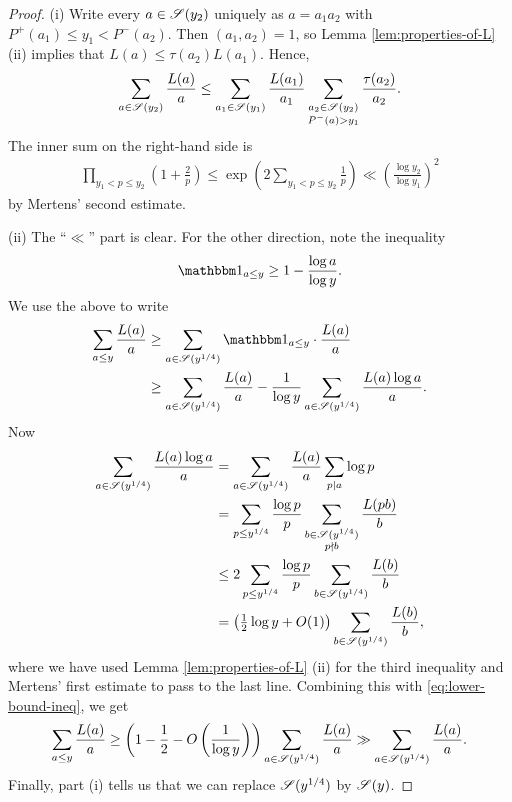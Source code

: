 \begin{proof}
    (i) Write every $a \in \mathscr{S}(y_2)$ uniquely as $a = a_1 a_2$ with $P^+(a_1) \le y_1 < P^- (a_2)$.
    Then $(a_1, a_2 ) = 1$, so Lemma \ref{lem:properties-of-L} (ii) implies that $L(a) \le \tau(a_2) L(a_1)$.
    Hence,
    \begin{equation*}
        \sum \limits_{a \in \mathscr{S}(y_2)} \frac{L(a)}{a} \le \sum \limits_{a_1 \in \mathscr{S}(y_1)} \frac{L(a_1)}{a_1} \sum \limits_{\substack{a_2 \in \mathscr{S}(y_2) \\ P^-(a) > y_1}} \frac{\tau(a_2)}{a_2}.
    \end{equation*}
    The inner sum on the right-hand side is
    \begin{align*}
        \prod \limits_{y_1 < p \le y_2}  \left(1 + \frac{2}{p} \right) \le \exp \left( 2 \sum \limits_{y_1 < p \le y_2} \frac{1}{p} \right) \ll \left(\frac{\log y_2}{\log y_1}\right)^2
    \end{align*}
    by Mertens' second estimate. 

    (ii) The ``$\ll$'' part is clear.
    For the other direction, note the inequality
    \begin{equation*}
        \ind{a \le y} \ge 1 - \frac{\log a}{\log y}.
    \end{equation*}
    We use the above to write
    \begin{align} \label{eq:lower-bound-ineq}
        \sum \limits_{a \le y} \frac{L(a)}{a} &\ge \sum \limits_{a \in \mcS(y^{1/4})} \ind{a \le y} \cdot \frac{L(a)}{a}\nonumber \\&\ge \sum \limits_{a \in \mcS(y^{1/4})} \frac{L(a)}{a}  - \frac{1}{\log y} \sum \limits_{a \in \mcS(y^{1/4})} \frac{L(a) \log a}{a}.
    \end{align}
    Now
    \begin{align*}
        \sum \limits_{a \in \mathscr{S}(y^{1/4})} \frac{L(a) \log a}{a} 
            &= \sum \limits_{a \in \mathscr{S}(y^{1/4})} \frac{L(a)}{a} \sum\limits_{p \mid a} \log p \\
            &= \sum \limits_{p \le y^{1/4}} \frac{\log p}{p} \sum\limits_{\substack{b \in \mathscr{S}(y^{1/4})\\p \nmid b}} \frac{L(pb)}{b} \\
            &\le 2\sum \limits_{p \le y^{1/4}} \frac{\log p}{p} \sum\limits_{b \in \mathscr{S}(y^{1/4})} \frac{L(b)}{b} \\
            &= \left({\tfrac{1}{2}} \log y + O(1) \right) \sum\limits_{b \in \mathscr{S}(y^{1/4})} \frac{L(b)}{b},
    \end{align*}
    where we have used Lemma \ref{lem:properties-of-L} (ii) for the third inequality and Mertens' first estimate to pass to the last line.
    Combining this with \eqref{eq:lower-bound-ineq}, we get
    \begin{equation*}
        \sum \limits_{a \le y} \frac{L(a)}{a} \ge \left(1 - \frac{1}{2} - O\left( \frac{1}{\log y} \right) \right)\sum \limits_{a \in \mathscr{S}(y^{1/4})} \frac{L(a)}{a} \gg \sum \limits_{a \in \mathscr{S}(y^{1/4})} \frac{L(a)}{a}.
    \end{equation*}
    Finally, part (i) tells us that we can replace $\mathscr{S}(y^{1/4})$ by $\mathscr{S}(y)$.
\end{proof}

